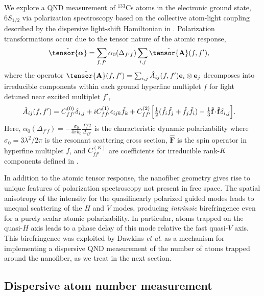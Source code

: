 \documentclass[preprint, aps,pra,onecolumn]{revtex4-1} %
\newcommand{\poltens}{\hat{\tensor{\boldsymbol{\alpha}}}}
\newcommand{\charpol}{\alpha_0(\Delta_{f'f})}
\begin{document}
We explore a QND measurement of ${}^{133}$Cs atoms in the electronic ground state, $6S_{1/2}$ via polarization spectroscopy based on the collective atom-light coupling described by the dispersive light-shift Hamiltonian in . Polarization transformations occur due to the tensor nature of the atomic response,
	\begin{align} \label{Eq::Polarizability}
		\poltens &=  \sum_{f,f'} \charpol \sum_{i,j} \hat{\tensor{\mbf{A}}}(f,f'),
	\end{align}
where the operator $\hat{\tensor{\mbf{A}}}(f,f') = \sum_{i,j} \hat{A}_{ij}(f,f')\mathbf{e}_i \otimes \mathbf{e}_j$ decomposes into irreducible components within each ground hyperfine multiplet $f$ for light detuned near excited multiplet $f'$,  
	\begin{align} \label{Eq::PolarizabilityIrrep}
		\hat{A}_{ij}(f,f')&=  C_{ff'}^{(0)} \delta_{i,j}+ iC_{ff'}^{(1)}\epsilon_{ijk}\hat{f}_k+ C_{ff'}^{(2)} \Big[ \mbox{$\frac{1}{2}$} ( \hat{f}_i\hat{f}_j +\hat{f}_j\hat{f}_i )-\mbox{$\frac{1}{3}$} \hat{\mathbf{f}}\!\cdot\!\hat{\mathbf{f}} \delta_{i,j} \Big]. 
\end{align}
Here, $\charpol = -\frac{\sigma_0}{4\pi k_0}\frac{\Gamma/2 }{\Delta_{ff'}}$ is the characteristic dynamic polarizability where $\sigma_0 = 3 \lambda^2/2\pi$ is the resonant scattering cross section, $\hat{\mathbf{F}}$ is the spin operator in hyperfine multiplet $f$, and $C_{ff'}^{(K)}$ are coefficients for irreducible rank-$K$ components defined in \cite{deutsch_quantum_2010}. 

In addition to the atomic tensor response, the nanofiber geometry gives rise to unique features of polarization spectroscopy not present in free space.  The spatial anisotropy of the intensity for the quasilinearly polarized guided modes leads to unequal scattering of the $H$ and $V$ modes, producing \emph{intrinsic} birefringence even for a purely scalar atomic polarizability.  
In particular, atoms trapped on the quasi-$H$ axis leads to a phase delay of this mode relative the fast quasi-$V$ axis. 
This birefringence was exploited by Dawkins {\em et al.} \cite{dawkins_dispersive_2011} as a mechanism for implementing a dispersive QND measurement of the number of atoms trapped around the nanofiber, as we treat in the next section. 


	\subsection{Dispersive atom number measurement} \label{Sec::AtomNumberMeasurement}
\end{document}
